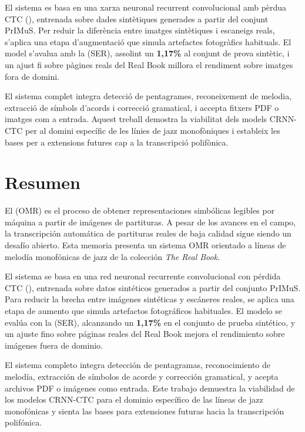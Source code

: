 \documentclass[11pt, a4paper]{report}
\begin{document}
El sistema es basa en una xarxa neuronal recurrent convolucional amb p\`erdua CTC (), entrenada sobre dades sint\`etiques generades a partir del conjunt PrIMuS. Per reduir la difer\`encia entre imatges sint\`etiques i escaneigs reals, s'aplica una etapa d'augmentaci\'o que simula artefactes fotogr\`afics habituals. El model s'avalua amb la  (SER), assolint un \textbf{1,17\%} al conjunt de prova sint\`etic, i un ajust fi sobre p\`agines reals del Real Book millora el rendiment sobre imatges fora de domini.

El sistema complet integra detecci\'o de pentagrames, reconeixement de melodia, extracci\'o de s\'imbols d'acords i correcci\'o gramatical, i accepta fitxers PDF o imatges com a entrada. Aquest treball demostra la viabilitat dels models CRNN-CTC per al domini espec\'ific de les l\'inies de jazz monof\`oniques i estableix les bases per a extensions futures cap a la transcripci\'o polif\`onica.

\chapter*{Resumen}

El  (OMR) es el proceso de obtener representaciones simb\'olicas legibles por m\'aquina a partir de im\'agenes de partituras. A pesar de los avances en el campo, la transcripci\'on autom\'atica de partituras reales de baja calidad sigue siendo un desaf\'io abierto. Esta memoria presenta un sistema OMR orientado a l\'ineas de melod\'ia monof\'onicas de jazz de la colecci\'on \textit{The Real Book}.

El sistema se basa en una red neuronal recurrente convolucional con p\'erdida CTC (), entrenada sobre datos sint\'eticos generados a partir del conjunto PrIMuS. Para reducir la brecha entre im\'agenes sint\'eticas y esc\'aneres reales, se aplica una etapa de aumento que simula artefactos fotogr\'aficos habituales. El modelo se eval\'ua con la  (SER), alcanzando un \textbf{1,17\%} en el conjunto de prueba sint\'etico, y un ajuste fino sobre p\'aginas reales del Real Book mejora el rendimiento sobre im\'agenes fuera de dominio.

El sistema completo integra detecci\'on de pentagramas, reconocimiento de melod\'ia, extracci\'on de s\'imbolos de acorde y correcci\'on gramatical, y acepta archivos PDF o im\'agenes como entrada. Este trabajo demuestra la viabilidad de los modelos CRNN-CTC para el dominio espec\'ifico de las l\'ineas de jazz monof\'onicas y sienta las bases para extensiones futuras hacia la transcripci\'on polifónica.
\end{document}
